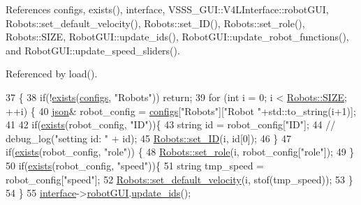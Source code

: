 References configs, exists(), interface, V\+S\+S\+S\+\_\+\+G\+U\+I\+::\+V4\+L\+Interface\+::robot\+G\+UI, Robots\+::set\+\_\+default\+\_\+velocity(), Robots\+::set\+\_\+\+I\+D(), Robots\+::set\+\_\+role(), Robots\+::\+S\+I\+ZE, Robot\+G\+U\+I\+::update\+\_\+ids(), Robot\+G\+U\+I\+::update\+\_\+robot\+\_\+functions(), and Robot\+G\+U\+I\+::update\+\_\+speed\+\_\+sliders().



Referenced by load().


\begin{DoxyCode}
37                                   \{
38     \textcolor{keywordflow}{if}(!\hyperlink{classjson_save_manager_a850cd6da63a9b10437c1dc7424dfee13}{exists}(\hyperlink{classjson_save_manager_acfbca58deba9ed712131c20a8f965dfd}{configs}, \textcolor{stringliteral}{"Robots"})) \textcolor{keywordflow}{return};
39     \textcolor{keywordflow}{for} (\textcolor{keywordtype}{int} i = 0; i < \hyperlink{class_robots_ae9df2f1d345ad6740f0459956cdd4712}{Robots::SIZE}; ++i) \{
40         \hyperlink{classnlohmann_1_1basic__json}{json}& robot\_config = \hyperlink{classjson_save_manager_acfbca58deba9ed712131c20a8f965dfd}{configs}[\textcolor{stringliteral}{"Robots"}][\textcolor{stringliteral}{"Robot "}+std::to\_string(i+1)];
41 
42         \textcolor{keywordflow}{if}(\hyperlink{classjson_save_manager_a850cd6da63a9b10437c1dc7424dfee13}{exists}(robot\_config, \textcolor{stringliteral}{"ID"}))\{
43             \textcolor{keywordtype}{string} \textcolor{keywordtype}{id} = robot\_config[\textcolor{stringliteral}{"ID"}];
44             \textcolor{comment}{// debug\_log("setting id: " + id);}
45             \hyperlink{class_robots_aea3f1278d0503cd81adc9ceea0a7d1df}{Robots::set\_ID}(i, \textcolor{keywordtype}{id}[0]);
46         \}
47         \textcolor{keywordflow}{if}(\hyperlink{classjson_save_manager_a850cd6da63a9b10437c1dc7424dfee13}{exists}(robot\_config, \textcolor{stringliteral}{"role"})) \{
48             \hyperlink{class_robots_a3694b6380b113b7c38a252fd3bbfcca3}{Robots::set\_role}(i, robot\_config[\textcolor{stringliteral}{"role"}]);
49         \}
50         \textcolor{keywordflow}{if}(\hyperlink{classjson_save_manager_a850cd6da63a9b10437c1dc7424dfee13}{exists}(robot\_config, \textcolor{stringliteral}{"speed"}))\{
51             \textcolor{keywordtype}{string} tmp\_speed = robot\_config[\textcolor{stringliteral}{"speed"}];
52             \hyperlink{class_robots_a54b514022589049ad5ae94ac11a453cd}{Robots::set\_default\_velocity}(i, stof(tmp\_speed));
53         \}
54     \}
55     \hyperlink{classjson_save_manager_a91983cf64bdd03c74cd6d4576cb521cf}{interface}->\hyperlink{class_v_s_s_s___g_u_i_1_1_v4_l_interface_ad7fa1969bc6892bad70672aacaa960c7}{robotGUI}.\hyperlink{class_robot_g_u_i_adb3915e1e117c2d3c1b66607c793819f}{update\_ids}();

\end{DoxyCode}
